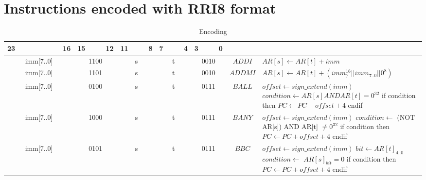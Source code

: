 \section{Instructions encoded with RRI8 format}
\setlength{\tabcolsep}{4pt}
\renewcommand{\arraystretch}{2}
	\begin{longtable}{llllllllllllllllllllllll  p{1cm}  p{7cm} | }
		\caption{Encoding\label{long}}\\
		23 & & & & & & & 16 & 15 & & & 12 & 11 & & & 8 & 7 & & & 4 & 3 & & & 0 & & \multicolumn{1}{c}{}\\
		\hline
        \endhead
		\multicolumn{8}{|c|}{imm[7..0]} & \multicolumn{4}{c|}{1100} & \multicolumn{4}{c|}{s} & \multicolumn{4}{c|}{t} & \multicolumn{4}{c|}{0010} & \multicolumn{1}{c|}{$ADDI$} & $AR[s] \leftarrow AR[t] + imm$ \\ \hline
		\multicolumn{8}{|c|}{imm[7..0]} & \multicolumn{4}{c|}{1101} & \multicolumn{4}{c|}{s} & \multicolumn{4}{c|}{t} & \multicolumn{4}{c|}{0010} & \multicolumn{1}{c|}{$ADDMI$} & $AR[s] \leftarrow AR[t] + (imm_7^{16} || imm_{7..0} || 0^8)$ \\ \hline
		\multicolumn{8}{|c|}{imm[7..0]} & \multicolumn{4}{c|}{0100} & \multicolumn{4}{c|}{s} & \multicolumn{4}{c|}{t} & \multicolumn{4}{c|}{0111} & \multicolumn{1}{c|}{$BALL$} & $offset \leftarrow sign\_extend(imm)$ \newline $condition \leftarrow AR[s] AND AR[t] = 0^{32}$ \newline if condition then \newline $PC \leftarrow PC + offset + 4$ \newline endif\\ \hline
		\multicolumn{8}{|c|}{imm[7..0]} & \multicolumn{4}{c|}{1000} & \multicolumn{4}{c|}{s} & \multicolumn{4}{c|}{t} & \multicolumn{4}{c|}{0111} & \multicolumn{1}{c|}{$BANY$} & $offset \leftarrow sign\_extend(imm)$ \newline  $condition \leftarrow$ (NOT AR[s]) AND AR[t] $\neq 0^{32}$ \newline if condition then \newline $PC \leftarrow PC + offset + 4$ \newline endif\\ \hline
		\multicolumn{8}{|c|}{imm[7..0]} & \multicolumn{4}{c|}{0101} & \multicolumn{4}{c|}{s} & \multicolumn{4}{c|}{t} & \multicolumn{4}{c|}{0111} & \multicolumn{1}{c|}{$BBC$} & $offset \leftarrow sign\_extend(imm)$ \newline $bit \leftarrow AR[t]_{4..0}$ \newline $condition \leftarrow$ $AR[s]_{bit} = 0$ \newline if condition then \newline $PC \leftarrow PC + offset + 4$ \newline endif\\ \hline

\end{longtable}
